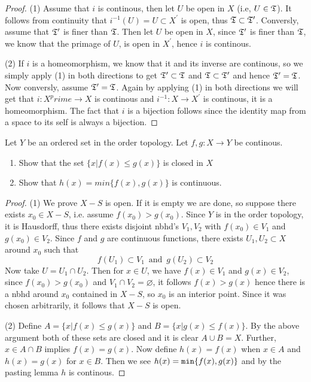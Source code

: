     \begin{proof}
        (1) Assume that $i$ is continous, then let $U$ be open in $X$ (i.e, $U \in \mathfrak{T}$). It follows from continuity that $i^{-1}(U) = U \subset X^\prime$ is open, thus 
        $\mathfrak{T} \subset \mathfrak{T}^\prime$. Conversly, assume that $\mathfrak{T}^\prime $ is finer than $\mathfrak{T}$. Then let $U$ be open in $X$, since $\mathfrak{T}^\prime$ is finer than $\mathfrak{T}$, we know that the primage of $U$, 
        is open in $X^\prime$, hence $i$ is continous. 

        (2) If $i$ is a homeomorphism, we know that it and its inverse are continous, 
        so we simply apply (1) in both directions to get $\mathfrak{T}^\prime \subset \mathfrak{T}$ and $\mathfrak{T} \subset \mathfrak{T}^\prime$ and hence $\mathfrak{T}^\prime = \mathfrak{T}$. Now conversly, assume $\mathfrak{T}^\prime = \mathfrak{T}$. Again by applying (1) in both directions 
        we will get that $i:X^prime \to X$ is continous and $i^{-1}:X \to X^\prime$ is continous, it is a homeomorphism. The fact that $i$ is a bijection follows since the identity map from a space to its self is always a bijection.  
    \end{proof}



    \question 
    Let $Y$ be an ordered set in the order topology. Let $f,g:X \to Y$ be continous. 
    \begin{enumerate}
        \item Show that the set $\{x|f(x) \leq g(x) \} $ is closed in $X$
        \item Show that $h(x) = min\{f(x), g(x) \}$ is continuous.
    \end{enumerate}

    \begin{proof}
        (1) We prove $X -S$ is open. If it is empty we are done, so suppose there exists $x_0 \in X - S$, i.e. assume 
        $f(x_0) > g(x_0)$. Since $Y$ is in the order topology, it is Hausdorff, thus there exists disjoint nbhd's $V_1, V_2$ with 
        $f(x_0) \in V_1$ and $g(x_0) \in V_2$. Since $f$ and $g$ are continuous functions, there exists $U_1, U_2 \subset X$ around $x_0$ such that 
        \[f(U_1) \subset V_1 \, \text{ and } \, g(U_2) \subset V_2\]
        Now take $U = U_1 \cap U_2$. Then for $x \in U$, we have $f(x) \in V_1 $ and $g(x) \in V_2$, since $f(x_0)> g(x_0)$ and $V_1 \cap V_2 = \varnothing$, 
        it follows $f(x) > g(x)$ hence there is a nbhd around $x_0$ contained in $X-S$, so $x_0$ is an interior point. Since it was chosen arbitrarily, it follows that 
        $X - S$ is open. 


        (2) 
        Define $A = \{x|f(x) \leq g(x) \}$ and $B = \{x|g(x) \leq f(x) \}$. By the above argument both of these sets are closed and it is clear $A \cup B = X$. Further,  $x \in A \cap B$ implies $f(x) = g(x)$.
        Now define $h(x) = f(x)$ when $x \in A$ and $h(x) = g(x)$ for $x \in B$. Then we see $h(x) = {\tt min}\{f(x), g(x)\}$ and by the pasting lemma $h$ is continous. 
       \end{proof}


